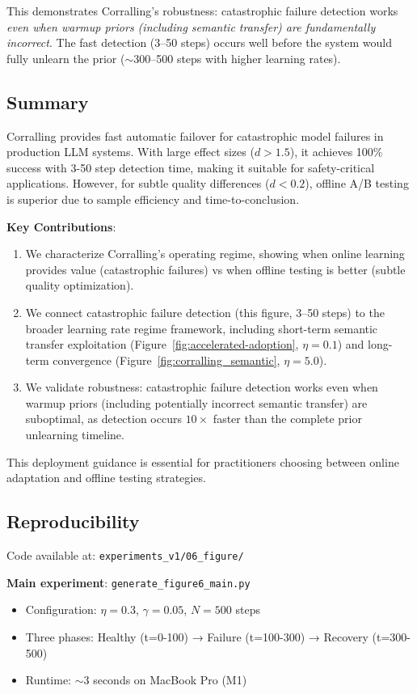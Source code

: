 This demonstrates Corralling's robustness: catastrophic failure detection works \emph{even when warmup priors (including semantic transfer) are fundamentally incorrect}. The fast detection (3--50 steps) occurs well before the system would fully unlearn the prior ($\sim$300--500 steps with higher learning rates).

\subsection{Summary}

Corralling provides fast automatic failover for catastrophic model failures in production LLM systems. With large effect sizes ($d > 1.5$), it achieves 100\% success with 3-50 step detection time, making it suitable for safety-critical applications. However, for subtle quality differences ($d < 0.2$), offline A/B testing is superior due to sample efficiency and time-to-conclusion.

\textbf{Key Contributions}: 
\begin{enumerate}
    \item We characterize Corralling's operating regime, showing when online learning provides value (catastrophic failures) vs when offline testing is better (subtle quality optimization).
    \item We connect catastrophic failure detection (this figure, 3--50 steps) to the broader learning rate regime framework, including short-term semantic transfer exploitation (Figure~\ref{fig:accelerated-adoption}, $\eta=0.1$) and long-term convergence (Figure~\ref{fig:corralling_semantic}, $\eta=5.0$).
    \item We validate robustness: catastrophic failure detection works even when warmup priors (including potentially incorrect semantic transfer) are suboptimal, as detection occurs $10\times$ faster than the complete prior unlearning timeline.
\end{enumerate}

This deployment guidance is essential for practitioners choosing between online adaptation and offline testing strategies.

\subsection{Reproducibility}

Code available at: \texttt{experiments\_v1/06\_figure/}

\textbf{Main experiment}: \texttt{generate\_figure6\_main.py}
\begin{itemize}
    \item Configuration: $\eta=0.3$, $\gamma=0.05$, $N=500$ steps
    \item Three phases: Healthy (t=0-100) → Failure (t=100-300) → Recovery (t=300-500)
    \item Runtime: $\sim$3 seconds on MacBook Pro (M1)
\end{itemize}


